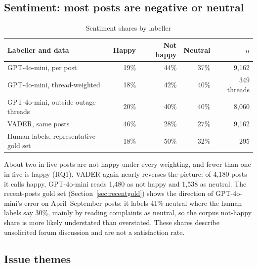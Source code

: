 \documentclass[11pt,a4paper]{article}
\begin{document}
\subsection{Sentiment: most posts are negative or neutral}

\begin{table}[H]
\centering
\caption{Sentiment shares by labeller}
\label{tab:corpussentiment}
\begin{tabular}{lrrrr}
\toprule
\textbf{Labeller and data} & \textbf{Happy} & \textbf{Not happy} & \textbf{Neutral} & \textbf{$n$} \\
\midrule
GPT-4o-mini, per post & 19\% & 44\% & 37\% & 9,162 \\
GPT-4o-mini, thread-weighted & 18\% & 42\% & 40\% & 349 threads \\
GPT-4o-mini, outside outage threads & 20\% & 40\% & 40\% & 8,060 \\
VADER, same posts & 46\% & 28\% & 27\% & 9,162 \\
Human labels, representative gold set & 18\% & 50\% & 32\% & 295 \\
\bottomrule
\end{tabular}
\end{table}

About two in five posts are not happy under every weighting, and fewer than one in five is happy (RQ1). VADER again nearly reverses the picture: of 4,180 posts it calls happy, GPT-4o-mini reads 1,480 as not happy and 1,538 as neutral. The recent-posts gold set (Section~\ref{sec:recentgold}) shows the direction of GPT-4o-mini's error on April--September posts: it labels 41\% neutral where the human labels say 30\%, mainly by reading complaints as neutral, so the corpus not-happy share is more likely understated than overstated. These shares describe unsolicited forum discussion and are not a satisfaction rate.

\subsection{Issue themes}
\end{document}

